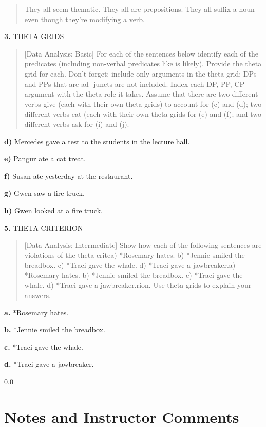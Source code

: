 \documentclass[11pt,notitlepage]{article}
\newcommand{\question}[2]{\textbf{#1.} #2}
\newcommand{\subquestion}[2]{\par\hspace{0.5cm} \textbf{#1)} #2}
\begin{document}
\begin{quote}
  They all seem thematic. They all are prepositions. They all suffix a
  noun even though they're modifying a verb.
\end{quote}


\question{3}{THETA GRIDS}
\begin{quote}
[Data Analysis; Basic]
For each of the sentences below identify each of the predicates
(including non-verbal predicates like is likely). Provide the theta
grid for each. Don’t forget: include only arguments in the theta grid;
DPs and PPs that are ad- juncts are not included. Index each DP, PP,
CP argument with the theta role it takes. Assume that there are two
different verbs give (each with their own theta grids) to account for
(c) and (d); two different verbs eat (each with their own theta grids
for (e) and (f); and two different verbs ask for (i) and (j).\end{quote}

\subquestion{d}{Mercedes gave a test to the students in the lecture
  hall.}

\subquestion{e}{Pangur ate a cat treat.}

\subquestion{f}{Susan ate yesterday at the restaurant.}

\subquestion{g}{Gwen saw a fire truck.}

\subquestion{h}{Gwen looked at a fire truck.}

\question{5}{THETA CRITERION}
\begin{quote}
[Data Analysis; Intermediate]
Show how each of the following sentences are violations of the theta
critea) *Rosemary hates.
b) *Jennie smiled the breadbox.
c) *Traci gave the whale.
d) *Traci gave a jawbreaker.a) *Rosemary hates.
b) *Jennie smiled the breadbox.
c) *Traci gave the whale.
d) *Traci gave a jawbreaker.rion. Use theta grids to explain your answers.
\end{quote}

\question{a}{*Rosemary hates.}

\question{b}{*Jennie smiled the breadbox.}

\question{c}{*Traci gave the whale.}

\question{d}{*Traci gave a jawbreaker.}

\newpage
  {\setlength{\baselineskip}%
           {0.0\baselineskip}
  \section*{Notes and Instructor Comments}
  \hrulefill \par}
\end{document}
